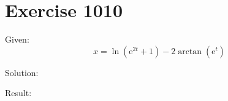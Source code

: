 \documentclass[a4paper, 10pt]{scrartcl}
\newcommand*\euler{\mathrm{e}}
\begin{document}
\section{Exercise 1010}

Given:
\[
x = \ln{(\euler^{2t} + 1)} - 2\arctan{(\euler^{t})}
\]

Solution:

Result:
\end{document}

